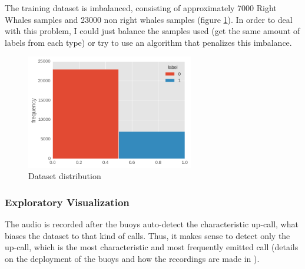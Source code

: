 \documentclass[]{article}
\begin{document}
The training dataset is imbalanced, consisting of approximately 7000 Right Whales samples and 23000 non right whales samples (figure \ref{img:train_dataset}). In order to deal with this problem, I could just balance the samples used (get the same amount of labels from each type) or try to use an algorithm that penalizes this imbalance.

\begin{figure}[htpb!]
\centering
\includegraphics[width= 0.65\textwidth]{./images/2_dataset}
\caption{Dataset distribution \label{img:train_dataset}}
\end{figure}


\subsubsection{Exploratory Visualization}\label{exploratory-visualization}

The audio is recorded after the buoys auto-detect the characteristic up-call, what biases the dataset to that kind of calls. Thus, it makes sense to detect only the up-call, which is the most characteristic and most frequently emitted call (details on the deployment of the buoys and how the recordings are made in \cite{McDonald2002}). 
\end{document}
